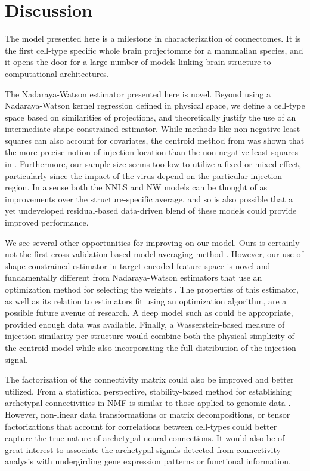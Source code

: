 \section{Discussion}

The model presented here is a milestone in characterization of connectomes.
It is the first cell-type specific whole brain projectomme for a mammalian species, and it opens the door for a large number of models linking brain structure to computational architectures. 

The Nadaraya-Watson estimator presented here is novel.
Beyond using a Nadaraya-Watson kernel regression defined in physical space, we define a cell-type space based on similarities of projections, and theoretically justify the use of an intermediate shape-constrained estimator. 
While methods like non-negative least squares can also account for covariates, the centroid method from \citet{Knox2019-ot} was shown that the more precise notion of injection location than the non-negative least squares in \citet{Oh2014-kh}.
Furthermore, our sample size seems too low to utilize a fixed or mixed effect, particularly since the impact of the virus depend on the particular injection region.
In a sense both the NNLS and NW models can be thought of as improvements over the structure-specific average, and so is also possible that a yet undeveloped residual-based data-driven blend of these models could provide improved performance.

We see several other opportunities for improving on our model.
Ours is certainly not the first cross-validation based model averaging method \citet{Gao2016-qe}.
However, our use of shape-constrained estimator in target-encoded feature space is novel and fundamentally different from Nadaraya-Watson estimators that use an optimization method for selecting the weights \citep{Saul2003-th}.
The properties of this estimator, as well as its relation to estimators fit using an optimization algorithm, are a possible future avenue of research.
A deep model such as \citet{Lotfollahi2019-tr} could be appropriate, provided enough data was available.
Finally, a Wasserstein-based measure of injection similarity per structure would combine both the physical simplicity of the centroid model while also incorporating the full distribution of the injection signal.

The factorization of the connectivity matrix could also be improved and better utilized.
From a statistical perspective, stability-based method for establishing archetypal connectivities in NMF is similar to those applied to genomic data \cite{Wu2016-gg, Kotliar2019-yj}.
However, non-linear data transformations or matrix decompositions, or tensor factorizations that account for correlations between cell-types could better capture the true nature of archetypal neural connections.
It would also be of great interest to associate the archetypal signals detected from connectivity analysis with undergirding gene expression patterns or functional information.


